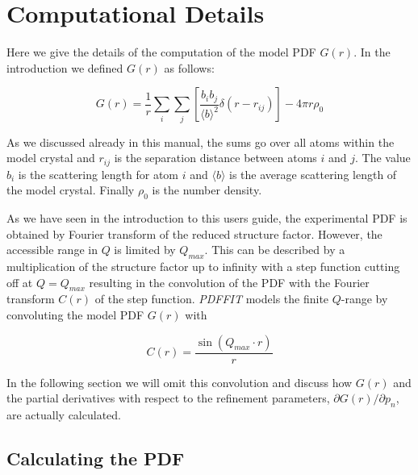 
\chapter{Computational Details \label{app-deriv}}

Here we give the details of the computation of the model PDF $G(r)$. In
the introduction we defined $G(r)$ as follows:

\begin{equation}
  G(r) = \frac{1}{r} \sum_{i}\sum_{j} \left [
         \frac{b_{i}b_{j}}{\langle b \rangle ^{2}}
         \delta (r - r_{ij}) \right ]   - 4 \pi r \rho_{0}
  \label{eq_gr}
\end{equation}

As we discussed already in this manual, the sums go over all atoms
within the model crystal and $r_{ij}$ is the separation distance
between atoms $i$ and $j$. The value $b_{i}$ is the scattering length
for atom $i$ and $\langle b \rangle$ is the average scattering length
of the model crystal. Finally $\rho_{0}$ is the number density. \par

As we have seen in the introduction to this users guide, the
experimental PDF is obtained by Fourier transform of the reduced
structure factor. However, the accessible range in $Q$ is limited by
$Q_{max}$. This can be described by a multiplication of the
structure factor up to infinity with a step function cutting off at
$Q=Q_{max}$ resulting in the convolution of the PDF with the Fourier
transform $C(r)$ of the step function. {\it PDFFIT} models the
finite $Q$-range by convoluting the model PDF $G(r)$ with

\begin{equation}
  C(r) = \frac{\sin(Q_{max} \cdot r)}{r}
  \label{eq_sinc}
\end{equation}

In the following section we will omit this convolution and discuss how
$G(r)$ and the partial derivatives with respect to the refinement
parameters, $\partial G(r)/ \partial p_{n}$, are actually calculated.


\section{Calculating the PDF}

